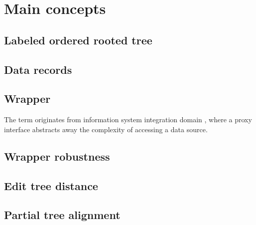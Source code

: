 \chapter{Main concepts}


\section{Labeled ordered rooted tree}
\section{Data records}

\section{Wrapper}

The term originates from information system integration domain \cite{Chang:2006:SWI:1159162.1159300}, where a proxy interface abstracts away the complexity of accessing a data source. 

\section{Wrapper robustness}
\section{Edit tree distance}
\section{Partial tree alignment}

